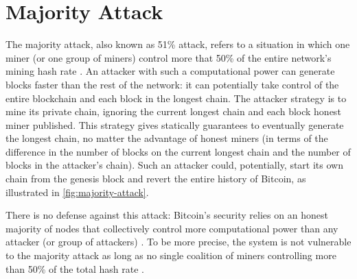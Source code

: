 \section{Majority Attack}
\label{sec:majority-attack}
The majority attack, also known as \num{51}\% attack, refers to a situation in which one miner (or one group of miners) control more that \num{50}\% of the entire network's mining hash rate \cite{majority_investopedia, majority_bitcoin_wiki}.
An attacker with such a computational power can generate blocks faster than the rest of the network:
it can potentially take control of the entire blockchain and each block in the longest chain.
The attacker strategy is to mine its private chain, ignoring the current longest chain and each block honest miner published.
This strategy gives statically guarantees to eventually generate the longest chain, no matter the advantage of honest miners (in terms of the difference in the number of blocks on the current longest chain and the number of blocks in the attacker's chain).
Such an attacker could, potentially, start its own chain from the genesis block and revert the entire history of Bitcoin, as illustrated in \cref{fig:majority-attack}.

There is no defense against this attack:
Bitcoin's security relies on an honest majority of nodes that collectively control more computational power than any attacker (or group of attackers) \cite{bitcoin_2009}.
To be more precise, the system is not vulnerable to the majority attack as long as no single coalition of miners controlling more than \num{50}\% of the total hash rate \cite{bitcoin_wiki_irreversible_transactions}.

